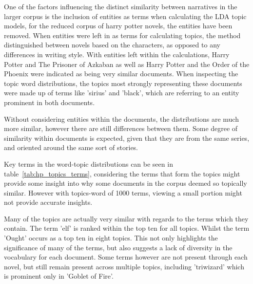 \documentclass[10pt]{report}
\begin{document}
One of the factors influencing the distinct similarity between narratives in the larger corpus is the inclusion of entities as terms when calculating the LDA topic models, for the reduced corpus of harry potter novels, the entities have been removed. When entities were left in as terms for calculating topics, the method distinguished between novels based on the characters, as opposed to any differences in writing style. With entities left within the calculations, Harry Potter and The Prisoner of Azkaban as well as Harry Potter and the Order of the Phoenix were indicated as being very similar documents. When inspecting the topic word distributions, the topics most strongly representing these documents were made up of terms like 'sirius' and 'black', which are referring to an entity prominent in both documents.

Without considering entities within the documents, the distributions are much more similar, however there are still differences between them. Some degree of similarity within documents is expected, given that they are from the same series, and oriented around the same sort of stories.

Key terms in the word-topic distributions can be seen in table~\ref{tab:hp_topics_terms}, considering the terms that form the topics might provide some insight into why some documents in the corpus deemed so topically similar. However with topics-word of 1000 terms, viewing a small portion might not provide accurate insights.

Many of the topics are actually very similar with regards to the terms which they contain. The term 'elf' is ranked within the top ten for all topics. Whilst the term 'Ought' occurs as a top ten in eight topics.  This not only highlights the significance of many of the terms, but also suggests a lack of diversity in the vocabulary for each document. Some terms however are not present through each novel, but still remain present across multiple topics, including 'triwizard' which is prominent only in 'Goblet of Fire'.
\end{document}
